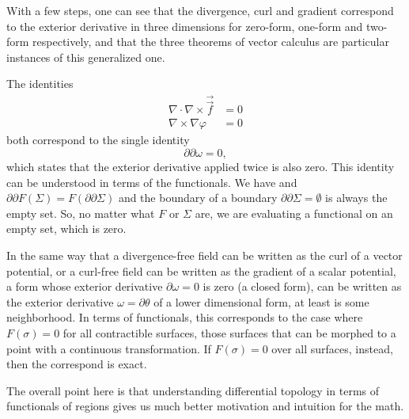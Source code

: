 \documentclass[10pt,twocolumn, nofootinbib]{revtex4-2}
\begin{document}
With a few steps, one can see that the divergence, curl and gradient correspond to the exterior derivative in three dimensions for zero-form, one-form and two-form respectively, and that the three theorems of vector calculus are particular instances of this generalized one.

The identities
\begin{equation*}
	\begin{aligned}
		\nabla \cdot \nabla \times \vec \vec{f} &= 0 \\
		\nabla \times \nabla \varphi &= 0
	\end{aligned}
\end{equation*}
both correspond to the single identity
\begin{equation*}
	\partial \partial \omega = 0,
\end{equation*}
which states that the exterior derivative applied twice is also zero. This identity can be understood in terms of the functionals. We have and $\partial \partial F(\Sigma) = F(\partial \partial \Sigma)$ and the boundary of a boundary $\partial \partial \Sigma = \emptyset$ is always the empty set. So, no matter what $F$ or $\Sigma$ are, we are evaluating a functional on an empty set, which is zero.

In the same way that a divergence-free field can be written as the curl of a vector potential, or a curl-free field can be written as the gradient of a scalar potential, a form whose exterior derivative $\partial \omega = 0$ is zero (a closed form), can be written as the exterior derivative $\omega = \partial \theta$ of a lower dimensional form, at least is some neighborhood. In terms of functionals, this corresponds to the case where $F(\sigma)=0$ for all contractible surfaces, those surfaces that can be morphed to a point with a continuous transformation. If $F(\sigma)=0$ over all surfaces, instead, then the correspond is exact. 

The overall point here is that understanding differential topology in terms of functionals of regions gives us much better motivation and intuition for the math.

\iffalse



\end{document}
